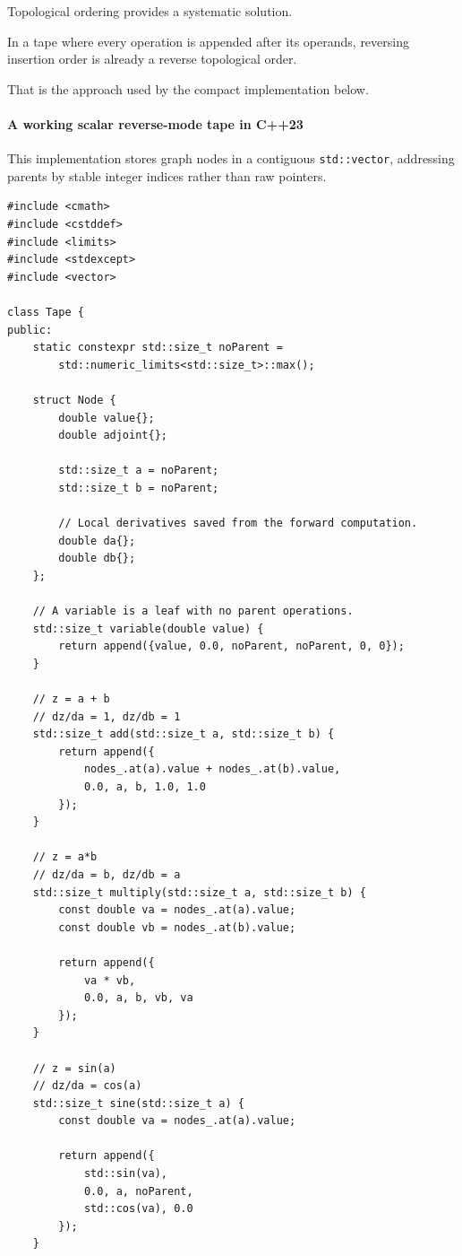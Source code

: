 Topological ordering provides a systematic solution.

In a tape where every operation is appended after its operands, reversing insertion order is already a reverse topological order.

That is the approach used by the compact implementation below.

\paragraph{A working scalar reverse-mode tape in C++23}\label{a-working-scalar-reverse-mode-tape-in-c23}

This implementation stores graph nodes in a contiguous \texttt{std::vector}, addressing parents by stable integer indices rather than raw pointers.

\begin{verbatim}
#include <cmath>
#include <cstddef>
#include <limits>
#include <stdexcept>
#include <vector>

class Tape {
public:
    static constexpr std::size_t noParent =
        std::numeric_limits<std::size_t>::max();

    struct Node {
        double value{};
        double adjoint{};

        std::size_t a = noParent;
        std::size_t b = noParent;

        // Local derivatives saved from the forward computation.
        double da{};
        double db{};
    };

    // A variable is a leaf with no parent operations.
    std::size_t variable(double value) {
        return append({value, 0.0, noParent, noParent, 0, 0});
    }

    // z = a + b
    // dz/da = 1, dz/db = 1
    std::size_t add(std::size_t a, std::size_t b) {
        return append({
            nodes_.at(a).value + nodes_.at(b).value,
            0.0, a, b, 1.0, 1.0
        });
    }

    // z = a*b
    // dz/da = b, dz/db = a
    std::size_t multiply(std::size_t a, std::size_t b) {
        const double va = nodes_.at(a).value;
        const double vb = nodes_.at(b).value;

        return append({
            va * vb,
            0.0, a, b, vb, va
        });
    }

    // z = sin(a)
    // dz/da = cos(a)
    std::size_t sine(std::size_t a) {
        const double va = nodes_.at(a).value;

        return append({
            std::sin(va),
            0.0, a, noParent,
            std::cos(va), 0.0
        });
    }


\end{verbatim}
